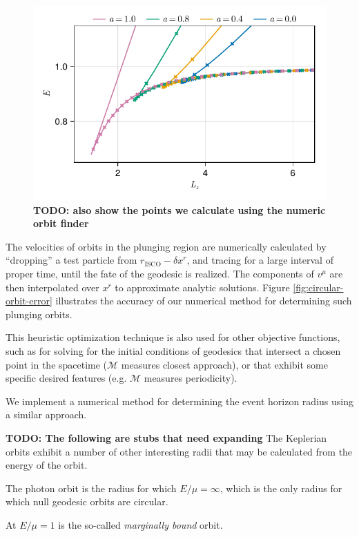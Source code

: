 \documentclass[fleqn,usenatbib]{mnras}
\newcommand{\todo}[1]{{\noindent \bf \color{red} TODO: #1}}
\newcommand{\risco}{r_\text{ISCO}}
\begin{document}
\begin{figure}
    \centering
    \includegraphics[width=0.95\linewidth]{figures/circular-orbits.E-Lz.pdf}
    \caption{\todo{also show the points we calculate using the numeric orbit finder}}
    \label{fig:e-lz-cusp}
\end{figure}

The velocities of orbits in the plunging region are numerically calculated by
``dropping'' a test particle from $\risco -  \delta x^r$, and tracing for a
large interval of proper time, until the fate of the geodesic is realized. The
components of $v^\mu$ are then interpolated over $x^r$ to approximate analytic
solutions. Figure \ref{fig:circular-orbit-error} illustrates the accuracy of our
numerical method for determining such plunging orbits.

This heuristic optimization technique is also used for other objective
functions, such as for solving for the initial conditions of  geodesics that
intersect a chosen point in the spacetime ($\mathscr{M}$ measures closest
approach), or that exhibit some specific desired features (e.g. $\mathscr{M}$
measures periodicity).

We implement a numerical method for determining the event horizon radius using a
similar approach.

\todo{The following are stubs that need expanding}
The Keplerian orbits exhibit a number of other interesting radii that may be
calculated from the energy of the orbit.

The photon orbit is the radius for which $E / \mu = \infty$, which is the only
radius for which null geodesic orbits are circular.

At $E / \mu = 1$ is the so-called \emph{marginally bound} orbit.
\end{document}
